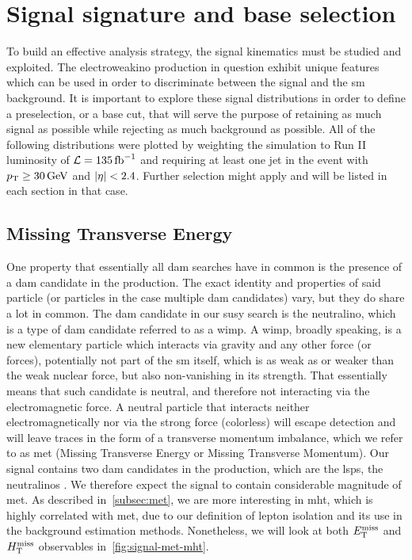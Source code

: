 \clearpage
\section{Signal signature and base selection}
\label{sec:signal-signature}
To build an effective analysis strategy, the signal kinematics must be studied and exploited. The electroweakino production in question exhibit unique features which can be used in order to discriminate between the signal and the \gls{sm} background. It is important to explore these signal distributions in order to define a preselection, or a base cut, that will serve the purpose of retaining as much signal as possible while rejecting as much background as possible. All of the following distributions were plotted by weighting the simulation to Run II luminosity of $\mathcal{L} = 135 \mbox{\ensuremath{\,\text{fb}^{-1}}}$ and requiring at least one jet in the event with $p_{\mathrm{T}} \geq 30\,\text{Ge\hspace{-.08em}V}$ and $\lvert \eta \rvert<2.4$. Further selection might apply and will be listed in each section in that case.

\subsection{Missing Transverse Energy}
\label{subsec:signal-met-mht}
One property that essentially all \gls{dam} searches have in common is the presence of a \gls{dam} candidate in the production. The exact identity and properties of said particle (or particles in the case multiple \gls{dam}  candidates) vary, but they do share a lot in common. The \gls{dam} candidate in our \gls{susy} search is the \gls{neutralino}, which is a type of \gls{dam} candidate referred to as a \gls{wimp}. A \gls{wimp}, broadly speaking, is a new elementary particle which interacts via gravity and any other force (or forces), potentially not part of the \gls{sm} itself, which is as weak as or weaker than the weak nuclear force, but also non-vanishing in its strength. That essentially means that such candidate is neutral, and therefore not interacting via the electromagnetic force. A neutral particle that interacts neither electromagnetically nor via the strong force (\ie colorless) will escape detection and will leave traces in the form of a transverse momentum imbalance, which we refer to as \gls{met} (Missing Transverse Energy or Missing Transverse Momentum). Our signal contains two \gls{dam} candidates in the production, which are the \glspl{lsp}, the \glspl{neutralino} \neuto. We therefore expect the signal to contain considerable magnitude of \gls{met}. As described in~\ref{subsec:met}, we are more interesting in \gls{mht}, which is highly correlated with \gls{met}, due to our definition of lepton isolation and its use in the background estimation methods. Nonetheless, we will look at both $E_{\mathrm{T}}^{\text{miss}}$ and $H_{\mathrm{T}}^{\text{miss}}$ observables in~\ref{fig:signal-met-mht}.

